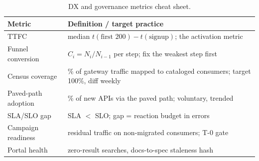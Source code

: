 \begin{table}[htbp]
\centering\small
\begin{tabularx}{\textwidth}{l X}
\toprule
\textbf{Metric} & \textbf{Definition / target practice} \\
\midrule
TTFC & median $t(\text{first 200}) - t(\text{signup})$; the activation metric \\
Funnel conversion & $C_i = N_i/N_{i-1}$ per step; fix the weakest step first \\
Census coverage & \% of gateway traffic mapped to cataloged consumers; target 100\%, diff weekly \\
Paved-path adoption & \% of new APIs via the paved path; voluntary, trended \\
SLA/SLO gap & SLA $<$ SLO; gap = reaction budget in errors~\cite{beyer2016sre} \\
Campaign readiness & residual traffic on non-migrated consumers; T-0 gate \\
Portal health & zero-result searches, docs-to-spec staleness hash \\
\bottomrule
\end{tabularx}
\caption{DX and governance metrics cheat sheet.}
\label{tab:ch20-metrics-quick}
\end{table}


